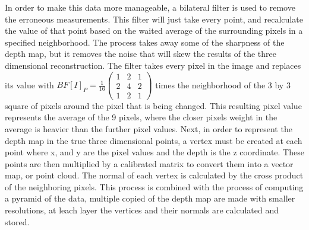 \documentclass[12pt,twocolumn]{article}
\begin{document}
\indent In order to make this data more manageable, a bilateral filter is used to remove the erroneous measurements. This filter will just take every point, and recalculate the value of that point based on the waited average of the surrounding pixels in a specified neighborhood. The process takes away some of the sharpness of the depth map, but it removes the noise that will skew the results of the three dimensional reconstruction. The filter takes every pixel in the image and replaces its value with $BF[I]_{P} = \frac{1}{16} \left( \begin{array}{ccc}
1 & 2 & 1 \\
2 & 4 & 2 \\
1 & 2 & 1 \end{array}  \right) $ times the neighborhood of the 3 by 3 square of pixels around the pixel that is being changed. This resulting pixel value represents the average of the 9 pixels, where the closer pixels weight in the average is heavier than the further pixel values. Next, in order to represent the depth map in the true three dimensional points, a vertex must be created at each point where x, and y are the pixel values and the depth is the z coordinate. These points are then multiplied by a calibrated matrix to convert them into a vector map, or point cloud. The normal of each vertex is calculated by the cross product of the neighboring pixels. This process is combined with the process of computing a pyramid of the data, multiple copied of the depth map are made with smaller resolutions, at leach layer the vertices and their normals are calculated and stored. 
\end{document}
